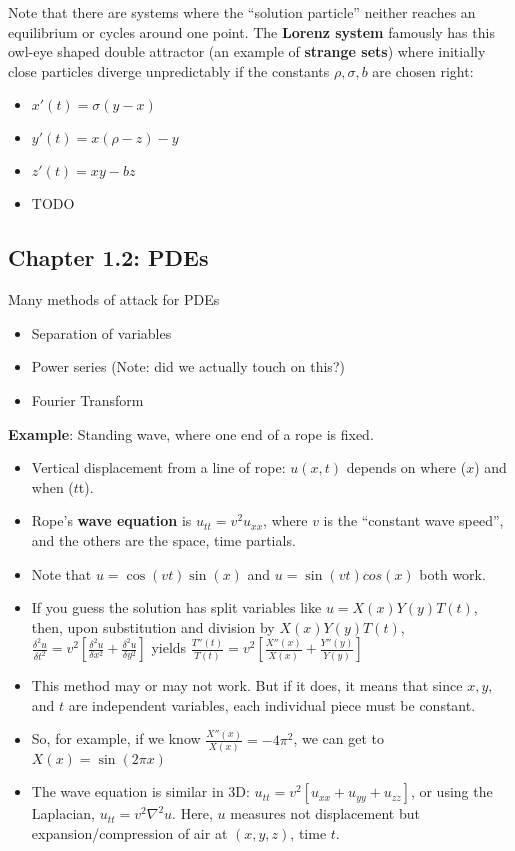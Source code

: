 \documentclass[11pt, oneside]{article}   	%
\begin{document}
Note that there are systems where the ``solution particle'' neither reaches an equilibrium or cycles around one point.  The \textbf{Lorenz system} famously has this owl-eye shaped double attractor (an example of \textbf{strange sets}) where initially close particles diverge unpredictably if the constants $\rho, \sigma, b$ are chosen right:

\begin{itemize}
\item $x'(t) = \sigma(y-x)$
\item $y'(t) = x(\rho - z) - y$
\item $z'(t) = xy-bz$
\end{itemize}

\begin{itemize}
\item TODO
\end{itemize}

\subsection{Chapter 1.2: PDEs}

Many methods of attack for PDEs

\begin{itemize}
\item Separation of variables
\item Power series (Note: did we actually touch on this?)
\item Fourier Transform
\end{itemize}

\textbf{Example}: Standing wave, where one end of a rope is fixed.  
\begin{itemize}
\item Vertical displacement from a line of rope: $u(x,t)$ depends on where ($x$) and when ($t$t).
\item Rope's \textbf{wave equation} is $u_{tt} = v^2u_{xx}$, where $v$ is the ``constant wave speed'', and the others are the space, time partials.
\item Note that $u = \cos(vt)\sin(x)$ and $u = \sin(vt)cos(x)$ both work.
\item If you guess the solution has split variables like $u = X(x)Y(y)T(t)$, then, upon substitution and division by $X(x)Y(y)T(t)$, $\frac{\delta^2 u}{\delta t^2} = v^2 [\frac{\delta^2 u}{\delta x^2} + \frac{\delta^2 u}{\delta y^2}]$ yields $\frac{T''(t)}{T(t)} = v^2 [\frac{X''(x)}{X(x)} + \frac{Y''(y)}{Y(y)} ]$
\item This method may or may not work.  But if it does, it means that since $x, y, $ and $t$ are independent variables, each individual piece must be constant.
\item So, for example, if we know $\frac{X''(x)}{X(x)} = -4\pi^2$, we can get to $X(x) = \sin(2\pi x)$
\item The wave equation is similar in 3D: $u_{tt} = v^2[u_{xx}+u_{yy}+u_{zz}]$, or using the Laplacian, $u_{tt} = v^2\nabla^2 u$.  Here, $u$ measures not displacement but expansion/compression of air at $(x,y,z)$, time $t$.
\end{itemize}
\end{document}

